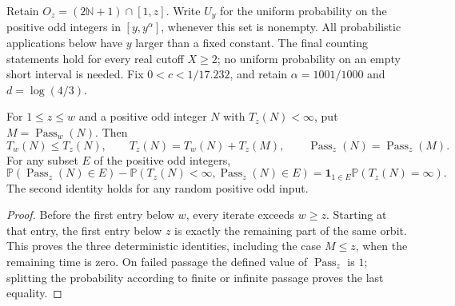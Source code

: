 Retain $O_z=(2\mathbb N+1)\cap[1,z]$. Write $U_y$ for the uniform probability on the positive odd integers
in $[y,y^\alpha]$, whenever this set is nonempty. All probabilistic
applications below have $y$ larger than a fixed constant. The final
counting statements hold for every real cutoff $X\ge2$; no uniform
probability on an empty short interval is needed. Fix
$0<c<1/17.232$, and retain $\alpha=1001/1000$ and $d=\log(4/3)$.

\begin{lemma}
\label{lem:Allikvere-nested-passage}
For $1\le z\le w$ and a positive odd integer $N$ with $T_z(N)<\infty$,
put $M=\operatorname{Pass}_w(N)$. Then
\[
 T_w(N)\le T_z(N),\qquad
 T_z(N)=T_w(N)+T_z(M),\qquad
 \operatorname{Pass}_z(N)=\operatorname{Pass}_z(M).
\]
For any subset $E$ of the positive odd integers,
\[
 \mathbb P(\operatorname{Pass}_z(N)\in E)
 -\mathbb P(T_z(N)<\infty,\operatorname{Pass}_z(N)\in E)
 =\mathbf1_{1\in E}\mathbb P(T_z(N)=\infty).
\]
The second identity holds for any random positive odd input.
\end{lemma}
\begin{proof}
Before the first entry below $w$, every iterate exceeds $w\ge z$.
Starting at that entry, the first entry below $z$ is exactly the
remaining part of the same orbit. This proves the three deterministic
identities, including the case $M\le z$, when the remaining time is zero.
On failed passage the defined value of $\operatorname{Pass}_z$ is $1$;
splitting the probability according to finite or infinite passage proves
the last equality.
\end{proof}

